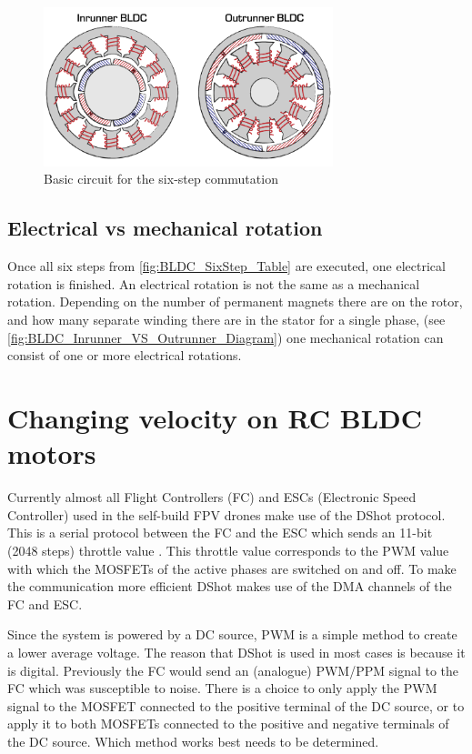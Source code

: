 \documentclass[]{report}
\begin{document}
\begin{figure}[H]
	\centering
	\includegraphics[width=0.75\textwidth]{InOutRunner-2.png}
	\caption{Basic circuit for the six-step commutation \cite{BLDC_Inrunner_VS_Outrunner_Diagram}}
	\label{fig:BLDC_Inrunner_VS_Outrunner_Diagram}
\end{figure}

\subsection{Electrical vs mechanical rotation}

Once all six steps from \autoref{fig:BLDC_SixStep_Table} are executed, one electrical rotation is finished. An electrical rotation is not the same as a mechanical rotation. Depending on the number of permanent magnets there are on the rotor, and how many separate winding there are in the stator for a single phase, (see \autoref{fig:BLDC_Inrunner_VS_Outrunner_Diagram}) one mechanical rotation can consist of one or more electrical rotations.

\section{Changing velocity on RC BLDC motors}
Currently almost all Flight Controllers (FC) and ESCs (Electronic Speed Controller) used in the self-build FPV drones make use of the DShot protocol. This is a serial protocol between the FC and the ESC which sends an 11-bit (2048 steps) throttle value \cite{DShot_Overview}. This throttle value corresponds to the PWM value with which the MOSFETs of the active phases are switched on and off. To make the communication more efficient DShot makes use of the DMA channels of the FC and ESC.

Since the system is powered by a DC source, PWM is a simple method to create a lower average voltage. The reason that DShot is used in most cases is because it is digital. Previously the FC would send an (analogue) PWM/PPM signal to the FC which was susceptible to noise. There is a choice to only apply the PWM signal to the MOSFET connected to the positive terminal of the DC source, or to apply it to both MOSFETs connected to the positive and negative terminals of the DC source. Which method works best needs to be determined.
\end{document}

